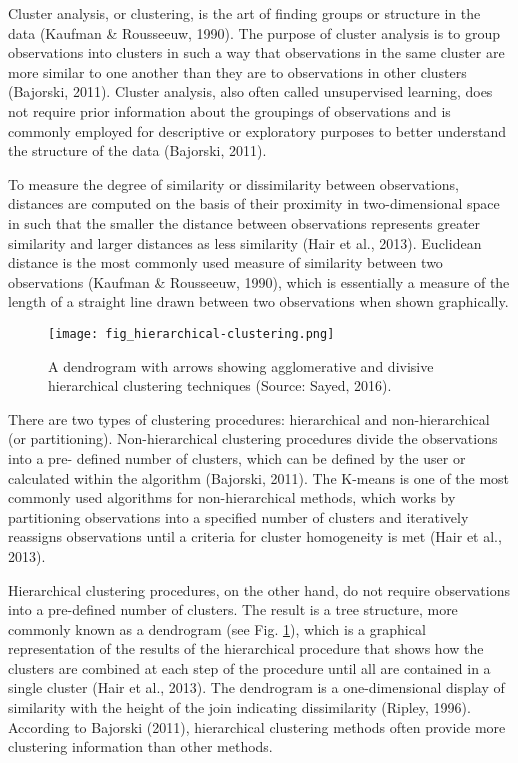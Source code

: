 Cluster analysis, or clustering, is the art of finding groups or structure in the data (Kaufman \& Rousseeuw, 1990). The purpose of cluster analysis is to group observations into clusters in such a way that observations in the same cluster are more similar to one another than they are to observations in other clusters (Bajorski, 2011). Cluster analysis, also often called unsupervised learning, does not require prior information about the groupings of observations and is commonly employed for descriptive or exploratory purposes to better understand the structure of the data (Bajorski, 2011).

To measure the degree of similarity or dissimilarity between observations, distances are computed on the basis of their proximity in two-dimensional space in such that the smaller the distance between observations represents greater similarity and larger distances as less similarity (Hair et al., 2013). Euclidean distance is the most commonly used measure of similarity between two observations (Kaufman \& Rousseeuw, 1990), which is essentially a measure of the length of a straight line drawn between two observations when shown graphically.

\begin{figure}
	\centering
	\texttt{[image: fig\_hierarchical-clustering.png]}
	\caption[A dendrogram with arrows showing agglomerative and divisive hierarchical clustering techniques.]{A dendrogram with arrows showing agglomerative and divisive hierarchical clustering techniques (Source: Sayed, 2016).}
	\label{fig: litrev-fig2.2}
\end{figure}

There are two types of clustering procedures: hierarchical and non-hierarchical (or partitioning). Non-hierarchical clustering procedures divide the observations into a pre- defined number of clusters, which can be defined by the user or calculated within the algorithm (Bajorski, 2011). The K-means is one of the most commonly used algorithms for non-hierarchical methods, which works by partitioning observations into a specified number of clusters and iteratively reassigns observations until a criteria for cluster homogeneity is met (Hair et al., 2013).

Hierarchical clustering procedures, on the other hand, do not require observations into a pre-defined number of clusters. The result is a tree structure, more commonly known as a dendrogram (see Fig. \ref{fig: litrev-fig2.2}), which is a graphical representation of the results of the hierarchical procedure that shows how the clusters are combined at each step of the procedure until all are contained in a single cluster (Hair et al., 2013). The dendrogram is a one-dimensional display of similarity with the height of the join indicating dissimilarity (Ripley, 1996). According to Bajorski (2011), hierarchical clustering methods often provide more clustering information than other methods.

